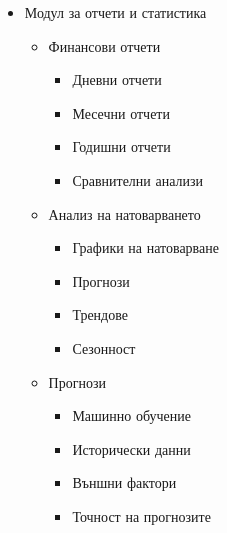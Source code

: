 \documentclass[12pt,a4paper]{article}
\begin{document}
\begin{itemize}
    \item Модул за отчети и статистика
    \begin{itemize}
        \item Финансови отчети
        \begin{itemize}
            \item Дневни отчети
            \item Месечни отчети
            \item Годишни отчети
            \item Сравнителни анализи
        \end{itemize}
        \item Анализ на натоварването
        \begin{itemize}
            \item Графики на натоварване
            \item Прогнози
            \item Трендове
            \item Сезонност
        \end{itemize}
        \item Прогнози
        \begin{itemize}
            \item Машинно обучение
            \item Исторически данни
            \item Външни фактори
            \item Точност на прогнозите
        \end{itemize}
    \end{itemize}
    

\end{itemize}
\end{document}
